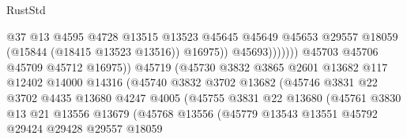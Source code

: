 \begin{lexlean}{RustStd}
\begin{coremodule}
                                                @37
                                                @13
                                                @4595
                                                @4728
                                                @13515
                                                @13523
                                                @45645
                                                @45649
                                                @45653
                                                @29557
                                                @18059
                                                (@15844 (@18415 @13523 @13516))
                                                @16975))
                                            @45693)))))))
                              @45703
                              @45706
                              @45709
                              @45712
                              @16975))
                          @45719
                          (@45730
                            @3832
                            @3865
                            @2601
                            @13682
                            @117
                            @12402
                            @14000
                            @14316
                            (@45740
                              @3832
                              @3702
                              @13682
                              (@45746
                                @3831
                                @22
                                @3702
                                @4435
                                @13680
                                @4247
                                @4005
                                (@45755
                                  @3831
                                  @22
                                  @13680
                                  (@45761
                                    @3830
                                    @13
                                    @21
                                    @13556
                                    @13679
                                    (@45768
                                      @13556
                                      (@45779
                                        @13543
                                        @13551
                                        @45792
                                        @29424
                                        @29428
                                        @29557
                                        @18059

\end{coremodule}
\end{lexlean}
